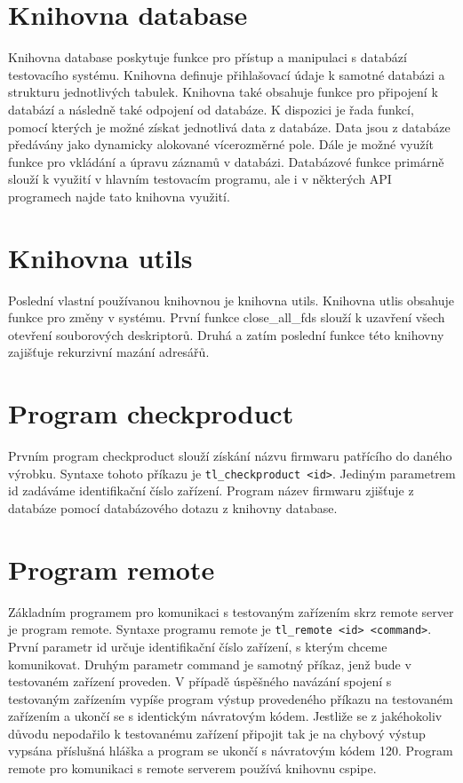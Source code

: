 \section{Knihovna database}
Knihovna database poskytuje funkce pro přístup a manipulaci s databází testovacího systému. Knihovna definuje přihlašovací údaje k samotné databázi a strukturu jednotlivých tabulek. Knihovna také obsahuje funkce pro připojení k databází a následně také odpojení od databáze. K dispozici je řada funkcí, pomocí kterých je možné získat jednotlivá data z databáze. Data jsou z databáze předávány jako dynamicky alokované vícerozměrné pole. Dále je možné využít funkce pro vkládání a úpravu záznamů v databázi. Databázové funkce primárně slouží k využití v hlavním testovacím programu, ale i v některých API programech najde tato knihovna využití.

\section{Knihovna utils}
Poslední vlastní používanou knihovnou je knihovna utils. Knihovna utlis obsahuje funkce pro změny v systému. První funkce close\_all\_fds slouží k uzavření všech otevření souborových deskriptorů. Druhá a zatím poslední funkce této knihovny zajišťuje rekurzivní mazání adresářů.

\section{Program checkproduct}
Prvním program checkproduct slouží získání názvu firmwaru patřícího do daného výrobku. Syntaxe tohoto příkazu je \texttt{tl\_checkproduct <id>}. Jediným parametrem id zadáváme identifikační číslo zařízení. Program název firmwaru zjišťuje z databáze pomocí databázového dotazu z knihovny database.

\section{Program remote}
Základním programem pro komunikaci s testovaným zařízením skrz remote server je program remote. Syntaxe programu remote je \texttt{tl\_remote <id> <command>}. První parametr id určuje identifikační číslo zařízení, s kterým chceme komunikovat. Druhým parametr command je samotný příkaz, jenž bude v testovaném zařízení proveden. V případě úspěšného navázání spojení s testovaným zařízením vypíše program výstup provedeného příkazu na testovaném zařízením a ukončí se s identickým návratovým kódem. Jestliže se z jakéhokoliv důvodu nepodařilo k testovanému zařízení připojit tak je na chybový výstup vypsána příslušná hláška a program se ukončí s návratovým kódem 120. Program remote pro komunikaci s remote serverem používá knihovnu cspipe.


